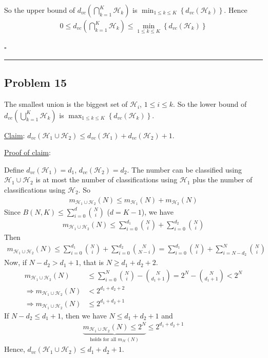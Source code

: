 \documentclass[12pt]{article}
\newcommand*{\QEDB}{\hfill\ensuremath{\square}}
\newcommand{\CBrackets}[1]{\left\{#1\right\}}
\newcommand{\ParTh}[1]{\left(#1\right)}
\newcommand{\horrule}[1]{\rule{\linewidth}{#1}}
\begin{document}
So the upper bound of $d_{vc}\ParTh{\bigcap^K_{k=1}\mathcal{H}_k}$ is $\min_{1\leq k\leq K}\CBrackets{d_{vc}\ParTh{\mathcal{H}_k}}$. Hence
\begin{align}
0\leq d_{vc}\ParTh{\bigcap^K_{k=1}\mathcal{H}_k}\leq\min_{1\leq k\leq K}\CBrackets{d_{vc}\ParTh{\mathcal{H}_k}}
\end{align}

\QEDB

\horrule{0.5pt}

\subsection*{Problem 15}

The smallest union is the biggest set of $\mathcal{H}_i$, $1\leq i\leq k$. So the lower bound of $d_{vc}\ParTh{\bigcup^K_{k=1}\mathcal{H}_k}$ is $\max_{1\leq k\leq K}\CBrackets{d_{vc}\ParTh{\mathcal{H}_k}}$.

\underline{Claim}: $d_{vc}\ParTh{\mathcal{H}_1\cup\mathcal{H}_2}\leq d_{vc}\ParTh{\mathcal{H}_1}+d_{vc}\ParTh{\mathcal{H}_2}+1$.

\underline{Proof of claim}:

Define $d_{vc}\ParTh{\mathcal{H}_1}=d_1$, $d_{vc}\ParTh{\mathcal{H}_2}=d_2$. The number can be classified using $\mathcal{H}_1\cup\mathcal{H}_2$ is at most  the
number of classifications using $\mathcal{H}_1$ plus the number of classifications using $\mathcal{H}_2$. So
\begin{align}
m_{\mathcal{H}_1\cup\mathcal{H}_2}\ParTh{N}\leq m_{\mathcal{H}_1}\ParTh{N}+m_{\mathcal{H}_2}\ParTh{N}
\end{align}
Since $B\ParTh{N,K}\leq\sum_{i=0}^{d}\binom{N}{i}$ ($d=K-1$), we have
\begin{align}
m_{\mathcal{H}_1\cup\mathcal{H}_2}\ParTh{N}\leq\sum_{i=0}^{d_1}\binom{N}{i}+\sum_{i=0}^{d_2}\binom{N}{i}
\end{align}
Then
\begin{align}
m_{\mathcal{H}_1\cup\mathcal{H}_2}\ParTh{N}\leq\sum_{i=0}^{d_1}\binom{N}{i}+\sum_{i=0}^{d_2}\binom{N}{N-i}=\sum_{i=0}^{d_1}\binom{N}{i}+\sum_{i=N-d_2}^{N}\binom{N}{i}
\end{align}
Now, if $N - d_2 > d_1 + 1$, that is $N \geq d_1 + d_2 + 2$.
\begin{align}
m_{\mathcal{H}_1\cup\mathcal{H}_2}\ParTh{N}&\leq\sum_{i=0}^{N}\binom{N}{i}-\binom{N}{d_1+1}=2^N-\binom{N}{d_1+1}<2^N\\
\Rightarrow m_{\mathcal{H}_1\cup\mathcal{H}_2}\ParTh{N}&<2^{d_1+d_2+2}\\
\Rightarrow m_{\mathcal{H}_1\cup\mathcal{H}_2}\ParTh{N}&\leq2^{d_1+d_2+1}
\end{align}
If $N-d_2\leq d_1+1$, then we have $N\leq d_1+d_2+1$ and
\begin{align}
\underbrace{m_{\mathcal{H}_1\cup\mathcal{H}_2}\ParTh{N}\leq2^N}_{\text{holds for all }m_{\mathcal{H}}\ParTh{N}}\leq2^{d_1+d_2+1}
\end{align}
Hence, $d_{vc}\ParTh{\mathcal{H}_1\cup\mathcal{H}_2}\leq d_1+d_2+1$.
\end{document}
